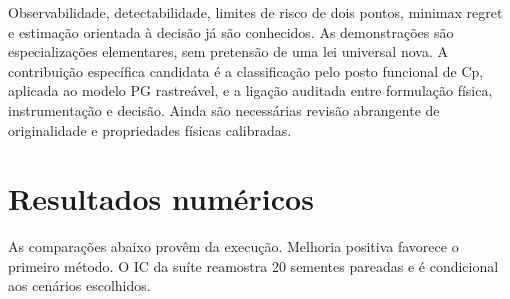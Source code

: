 \documentclass[
  11pt,
]{article}
\begin{document}
Observabilidade, detectabilidade, limites de risco de dois pontos,
minimax regret e estimação orientada à decisão já são conhecidos. As
demonstrações são especializações elementares, sem pretensão de uma lei
universal nova. A contribuição específica candidata é a classificação
pelo posto funcional de Cp, aplicada ao modelo PG rastreável, e a
ligação auditada entre formulação física, instrumentação e decisão.
Ainda são necessárias revisão abrangente de originalidade e propriedades
físicas calibradas.

\hypertarget{resultados-numuxe9ricos}{%
\section{Resultados numéricos}\label{resultados-numuxe9ricos}}

As comparações abaixo provêm da execução. Melhoria positiva favorece o
primeiro método. O IC da suíte reamostra 20 sementes pareadas e é
condicional aos cenários escolhidos.

\begingroup\footnotesize
\end{document}
